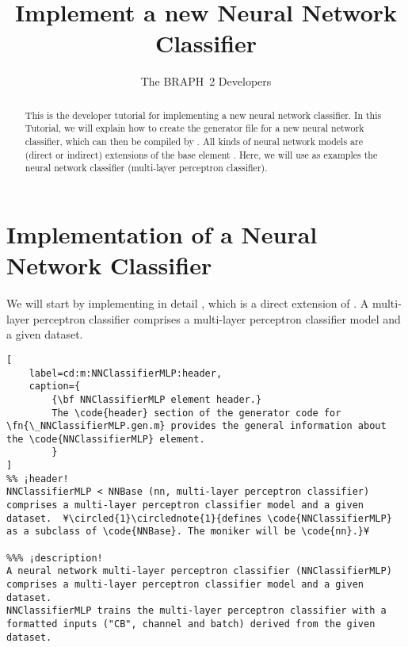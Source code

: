 \documentclass{tufte-handout}
\title{Implement a new Neural Network Classifier}
\author[The BRAPH~2 Developers]{The BRAPH~2 Developers}
\begin{document}
\maketitle

\begin{abstract}
\noindent
This is the developer tutorial for implementing a new neural network classifier. 
In this Tutorial, we will explain how to create the generator file  for a new neural network classifier, which can then be compiled by . All kinds of neural network models are (direct or indirect) extensions of the base element . Here, we will use as examples the neural network classifier  (multi-layer perceptron classifier).
\end{abstract}

\tableofcontents

\clearpage
\section{Implementation of a Neural Network Classifier}

We will start by implementing in detail , which is a direct extension of .
A multi-layer perceptron classifier  comprises a multi-layer perceptron classifier model and a given dataset.

\begin{lstlisting}[
	label=cd:m:NNClassifierMLP:header,
	caption={
		{\bf NNClassifierMLP element header.}
		The \code{header} section of the generator code for \fn{\_NNClassifierMLP.gen.m} provides the general information about the \code{NNClassifierMLP} element.
		}
]
%% ¡header!
NNClassifierMLP < NNBase (nn, multi-layer perceptron classifier) comprises a multi-layer perceptron classifier model and a given dataset.  ¥\circled{1}\circlednote{1}{defines \code{NNClassifierMLP} as a subclass of \code{NNBase}. The moniker will be \code{nn}.}¥

%%% ¡description!
A neural network multi-layer perceptron classifier (NNClassifierMLP) comprises a multi-layer perceptron classifier model and a given dataset.
NNClassifierMLP trains the multi-layer perceptron classifier with a formatted inputs ("CB", channel and batch) derived from the given dataset.
\end{lstlisting}
\end{document}
